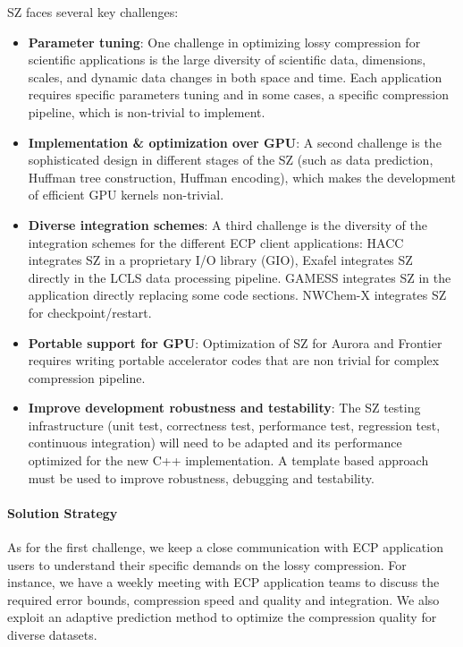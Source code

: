 SZ faces several key challenges:
\begin{itemize}
\item \textbf{Parameter tuning}: One challenge in optimizing lossy compression for scientific applications is the large
diversity of scientific data, dimensions, scales, and dynamic data changes in both space and time. Each application requires specific parameters tuning and in some cases, a specific compression pipeline, which is non-trivial to implement.
\item \textbf{Implementation \& optimization over GPU}: A second challenge is the sophisticated design in different stages of the SZ (such as data prediction, Huffman tree construction, Huffman encoding), which makes the development of efficient GPU kernels non-trivial. 
\item \textbf{Diverse integration schemes}: A third challenge is the diversity of the integration schemes for the different ECP client applications: HACC integrates SZ in a proprietary I/O library (GIO), Exafel integrates SZ directly in the LCLS data processing pipeline. GAMESS integrates SZ in the application directly replacing some code sections. NWChem-X integrates SZ for checkpoint/restart. 
\item \textbf{Portable support for GPU}: Optimization of SZ for Aurora and Frontier requires writing portable accelerator codes that are non trivial for complex compression pipeline. 
\item \textbf{Improve development robustness and testability}: The SZ testing infrastructure (unit test, correctness test, performance test, regression test, continuous integration) will need to be adapted and its performance optimized for the new C++ implementation. A template based approach must be used to improve robustness, debugging and testability.
\end{itemize}

\paragraph{Solution Strategy}

As for the first challenge, we keep a close communication with ECP application users to understand their specific demands on the lossy compression. For instance, we have a weekly meeting with ECP application teams to discuss the required error bounds, compression speed and quality and integration. We also exploit an adaptive prediction method to optimize the compression quality for diverse datasets. 

